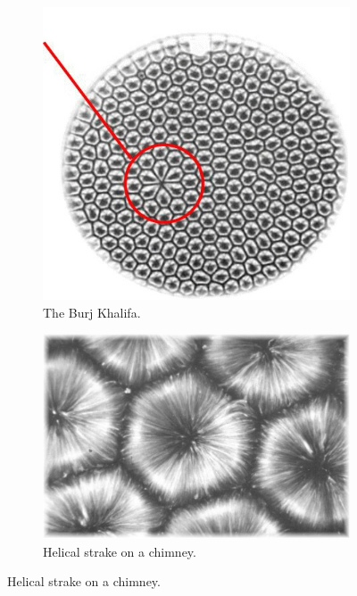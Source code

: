 \documentclass[11pt]{article}
\begin{document}
\begin{figure}[!htb]
	\centering
	\begin{subfigure}[b]{0.45\textwidth}
		\includegraphics[width=\textwidth]{RB-convec1}
		\caption{The Burj Khalifa.}
		\label{fig:RBconvec1}
	\end{subfigure}
	\hfill
	\begin{subfigure}[b]{0.45\textwidth}
		\includegraphics[width=\textwidth]{RB-convec2}
		\caption{Helical strake on a chimney.}
		\label{fig:RBconvec2}
	\end{subfigure}
\end{figure}
\end{document}
